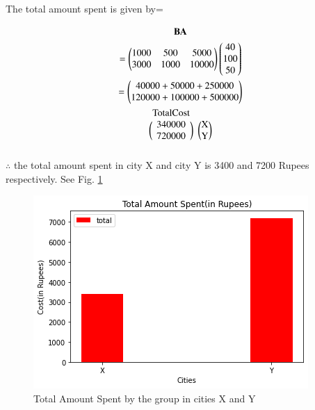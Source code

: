 
The total amount spent is given by=

    \begin{multline}
    \vec{B}\vec{A}\\
    =\myvec{1000&500&5000\\3000&1000&10000}\myvec{40\\100\\50}\\
    =\myvec{40000+50000+250000\\120000+100000+500000}\\
    \begin{blockarray}{cc}
    \text{TotalCost} \\
    \begin{block}{(c)(c)}
    340000&\text{X}\\
    720000&\text{Y}\\
    \end{block}
    \end{blockarray}
    \end{multline}
$\therefore$ the total amount spent in city X and city Y is 3400 and 7200 Rupees respectively.  See Fig. \ref{matrix/64fig:Profit}	
%
\begin{figure}[!ht]
\centering
\includegraphics[width=\columnwidth]{solutions/su2021/64/figure8.png}
\caption{Total Amount Spent by the group in cities X and Y}
\label{matrix/64fig:Profit}	
\end{figure}
